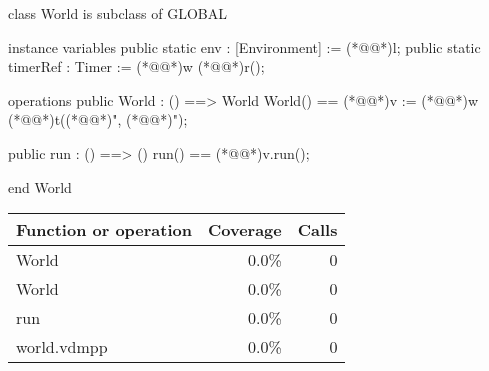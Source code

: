\documentclass[a4paper]{article}
\begin{document}
\title{}
\author{}
\begin{vdm_al}
class World is subclass of GLOBAL

instance variables
    public static env : [Environment] := (*@@*)l;
    public static timerRef : Timer := (*@@*)w (*@@*)r();

operations
    public World : () ==> World
    World() == (*@@*)v := (*@@*)w (*@@*)t((*@@*)", (*@@*)");

    public run : () ==> ()
    run() == (*@@*)v.run();

end World
\end{vdm_al}
\bigskip
\begin{longtable}{|l|r|r|}
\hline
Function or operation & Coverage & Calls \\
\hline
\hline
World & 0.0\% & 0 \\
\hline
World & 0.0\% & 0 \\
\hline
run & 0.0\% & 0 \\
\hline
\hline
world.vdmpp & 0.0\% & 0 \\
\hline
\end{longtable}
\end{document}
